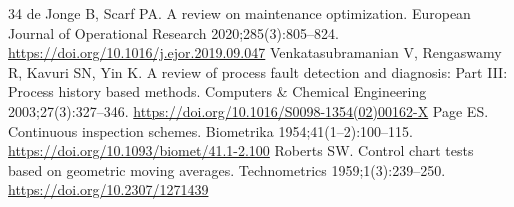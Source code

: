 \documentclass[a4paper,fleqn,doubleblind]{cas-dc}
\begin{document}
\begin{thebibliography}{34}
 de Jonge B, Scarf PA. A review on maintenance optimization. European Journal of Operational Research 2020;285(3):805--824. \url{https://doi.org/10.1016/j.ejor.2019.09.047}
 Venkatasubramanian V, Rengaswamy R, Kavuri SN, Yin K. A review of process fault detection and diagnosis: Part III: Process history based methods. Computers \& Chemical Engineering 2003;27(3):327--346. \url{https://doi.org/10.1016/S0098-1354(02)00162-X}
 Page ES. Continuous inspection schemes. Biometrika 1954;41(1--2):100--115. \url{https://doi.org/10.1093/biomet/41.1-2.100}
 Roberts SW. Control chart tests based on geometric moving averages. Technometrics 1959;1(3):239--250. \url{https://doi.org/10.2307/1271439}
\end{thebibliography}
\end{document}
